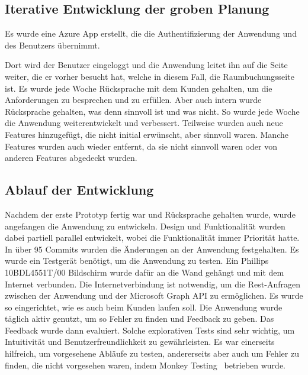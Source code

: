 \subsection{Iterative Entwicklung der groben Planung}\label{subsec:iterative-entwicklung-der-groben-planung}
Es wurde eine Azure App erstellt, die die Authentifizierung der Anwendung und des Benutzers übernimmt.
\newline

Dort wird der Benutzer eingeloggt und die Anwendung leitet ihn auf die Seite weiter, die er vorher besucht hat, welche in diesem Fall, die Raumbuchungsseite ist.
\newline
Es wurde jede Woche Rücksprache mit dem Kunden gehalten, um die Anforderungen zu besprechen und zu erfüllen.
Aber auch intern wurde Rücksprache gehalten, was denn sinnvoll ist und was nicht.
\newline
So wurde jede Woche die Anwendung weiterentwickelt und verbessert.
Teilweise wurden auch neue Features hinzugefügt, die nicht initial erwünscht, aber sinnvoll waren.
Manche Features wurden auch wieder entfernt, da sie nicht sinnvoll waren oder von anderen Features abgedeckt wurden.
\newline
\newline
\subsection{Ablauf der Entwicklung}\label{subsec:ablauf-der-entwicklung}
Nachdem der erste Prototyp fertig war und Rücksprache gehalten wurde, wurde angefangen die Anwendung zu entwickeln.
Design und Funktionalität wurden dabei partiell parallel entwickelt, wobei die Funktionalität immer Priorität hatte.
In über 95 Commits wurden die Änderungen an der Anwendung festgehalten.
\newline
Es wurde ein Testgerät benötigt, um die Anwendung zu testen.
Ein Phillips 10BDL4551T/00 Bildschirm wurde dafür an die Wand gehängt und mit dem Internet verbunden.
Die Internetverbindung ist notwendig, um die Rest-Anfragen zwischen der Anwendung und der Microsoft Graph API zu ermöglichen.
Es wurde so eingerichtet, wie es auch beim Kunden laufen soll.
\newline
Die Anwendung wurde täglich aktiv genutzt, um so Fehler zu finden und Feedback zu geben.
Das Feedback wurde dann evaluiert.
Solche explorativen Tests sind sehr wichtig, um Intuitivität und Benutzerfreundlichkeit zu gewährleisten.
Es war einerseits hilfreich, um vorgesehene Abläufe zu testen, andererseits aber auch um Fehler zu finden, die nicht vorgesehen waren, indem Monkey Testing~\cite{Monkey-Testing-Book1} betrieben wurde.
\newline
